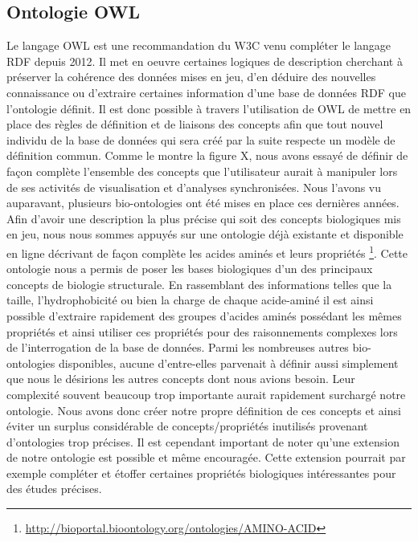 \subsection{Ontologie OWL}

Le langage OWL est une recommandation du W3C venu compléter le langage RDF depuis 2012. Il met en oeuvre certaines logiques de description cherchant à préserver la cohérence des données mises en jeu, d'en déduire des nouvelles connaissance ou d'extraire certaines information d'une base de données RDF que l'ontologie définit. Il est donc possible à travers l'utilisation de OWL de mettre en place des règles de définition et de liaisons des concepts afin que tout nouvel individu de la base de données qui sera créé par la suite respecte un modèle de définition commun. 
Comme le montre la figure X, nous avons essayé de définir de façon complète l'ensemble des concepts que l'utilisateur aurait à manipuler lors de ses activités de visualisation et d'analyses synchronisées. 
Nous l'avons vu auparavant, plusieurs bio-ontologies ont été mises en place ces dernières années. Afin d'avoir une description la plus précise qui soit des concepts biologiques mis en jeu, nous nous sommes appuyés sur une ontologie déjà existante et disponible en ligne décrivant de façon complète les acides aminés et leurs propriétés \footnote{\url{http://bioportal.bioontology.org/ontologies/AMINO-ACID}}. Cette ontologie nous a permis de poser les bases biologiques d'un des principaux concepts de biologie structurale. En rassemblant des informations telles que la taille, l'hydrophobicité ou bien la charge de chaque acide-aminé il est ainsi possible d'extraire rapidement des groupes d'acides aminés possédant les mêmes propriétés et ainsi utiliser ces propriétés pour des raisonnements complexes lors de l'interrogation de la base de données. Parmi les nombreuses autres bio-ontologies disponibles, aucune d'entre-elles parvenait à définir aussi simplement que nous le désirions les autres concepts dont nous avions besoin. Leur complexité souvent beaucoup trop importante aurait rapidement surchargé notre ontologie. Nous avons donc créer notre propre définition de ces concepts et ainsi éviter un surplus considérable de concepts/propriétés inutilisés provenant d'ontologies trop précises. Il est cependant important de noter qu'une extension de notre ontologie est possible et même encouragée. Cette extension pourrait par exemple compléter et étoffer certaines propriétés biologiques intéressantes pour des études précises.
